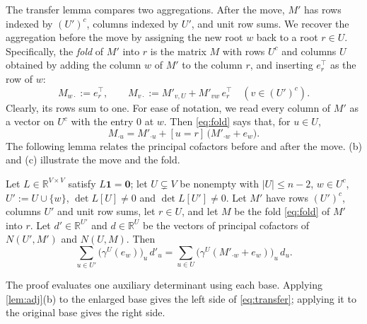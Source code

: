 \documentclass[onefignum,onetabnum]{siamart250211}
\numberwithin{theorem}{section}
\numberwithin{equation}{section}
\newcommand{\R}{\mathbb{R}}
\newcommand{\one}{\mathbf{1}}
\newcommand{\zero}{\mathbf{0}}
\begin{document}
The transfer lemma compares two aggregations. After the move, $M'$
has rows indexed by $(U')^c$, columns indexed by $U'$, and unit row
sums. We recover the aggregation before the move by assigning the
new root $w$ back to a root $r\in U$.
Specifically, the \emph{fold} of $M'$ into $r$ is the matrix $M$ with
rows $U^c$ and columns $U$ obtained by adding the column $w$ of $M'$ to
the column $r$, and inserting $e_r^{\top}$ as the row of $w$:
\begin{equation}\label{eq:fold}
M_{w\cdot}:=e_r^{\top},\qquad
M_{v\cdot}:=M'_{v,U}+M'_{vw}\,e_r^{\top}\quad(v\in (U')^c).
\end{equation}
Clearly, its rows sum to one. For ease of notation, we read every
column of $M'$ as a vector on $U^c$ with the entry $0$ at $w$. Then
\eqref{eq:fold} says that, for $u\in U$,
\begin{equation}\label{eq:foldcol}
M_{\cdot u}=M'_{\cdot u}+[u=r]\,\big(M'_{\cdot w}+e_w\big).
\end{equation}
The following lemma relates the principal cofactors before and after
the move. (b) and (c) illustrate the move and the
fold.
\begin{lemma}\label{lem:transfer}
Let $L\in\R^{V\times V}$ satisfy $L\one=\zero$; let $U\subsetneq V$ be
nonempty with $|U|\le n-2$, $w\in U^c$, $U':=U\cup\{w\}$,
$\det L[U]\ne0$ and $\det L[U']\ne0$. Let $M'$ have rows $(U')^c$,
columns $U'$ and unit row sums, let $r\in U$, and let $M$ be the fold
\eqref{eq:fold} of $M'$ into $r$. Let $d'\in\R^{U'}$ and $d\in\R^{U}$
be the vectors of principal cofactors of $N(U',M')$ and $N(U,M)$. Then
\begin{equation}\label{eq:transfer}
\sum_{u\in U'}\big(\gamma^{U}(e_w)\big)_u\,d'_u
=\sum_{u\in U}\big(\gamma^{U}(M'_{\cdot w}+e_w)\big)_u\,d_u .
\end{equation}
\end{lemma}

The proof evaluates one auxiliary determinant using each base.
Applying \cref{lem:adj}(b) to the enlarged base gives the left side of
\eqref{eq:transfer}; applying it to the original base gives the right
side.
\end{document}
